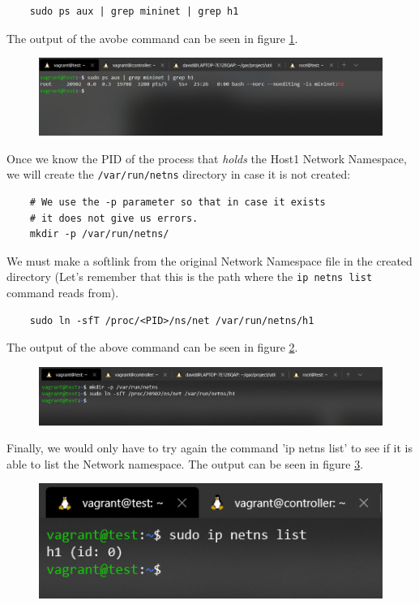 \documentclass[12pt]{article}
\begin{document}
			\begin{verbatim}
	sudo ps aux | grep mininet | grep h1
			\end{verbatim}

			The output of the avobe command can be seen in figure \ref{f:h1_pid}.

			\begin{figure}[!htb]
				\centering
				\includegraphics[width=\linewidth]{h1_pid.png}
				\label{f:h1_pid}
			\end{figure}

			Once we know the PID of the process that \textit{holds} the Host1 Network Namespace, we will create the \texttt{/var/run/netns} directory in case it is not created:

			\begin{verbatim}
	# We use the -p parameter so that in case it exists
	# it does not give us errors.
	mkdir -p /var/run/netns/
			\end{verbatim}

			We must make a softlink from the original Network Namespace file in the created directory (Let's remember that this is the path where the \texttt{ip netns list} command reads from).

			\begin{verbatim}
	sudo ln -sfT /proc/<PID>/ns/net /var/run/netns/h1
			\end{verbatim}

			The output of the above command can be seen in figure \ref{f:lnk}.

			\begin{figure}[!htb]
				\centering
				\includegraphics[width=\linewidth]{lnk.png}
				\label{f:lnk}
			\end{figure}

			Finally, we would only have to try again the command 'ip netns list' to see if it is able to list the Network namespace. The output can be seen in figure \ref{f:it_works}.
            \newpage
			\begin{figure}[!htb]
				\centering
				\includegraphics[width=\linewidth]{it_works.png}
				\label{f:it_works}
			\end{figure}
                
\end{document}

